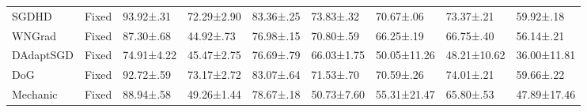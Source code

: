 \begin{tabular}{lllllllll}
    SGDHD                    & Fixed      & 93.92±.31              & 72.29±2.90          & 83.36±.25           & 73.83±.32           & 70.67±.06      & 73.37±.21             & 59.92±.18             \\
    WNGrad                   & Fixed      & 87.30±.68              & 44.92±.73           & 76.98±.15           & 70.80±.59           & 66.25±.19      & 66.75±.40             & 56.14±.21             \\
    DAdaptSGD                & Fixed      & 74.91±4.22             & 45.47±2.75          & 76.69±.79           & 66.03±1.75          & 50.05±11.26    & 48.21±10.62           & 36.00±11.81           \\
    DoG                      & Fixed      & 92.72±.59              & 73.17±2.72          & 83.07±.64           & 71.53±.70           & 70.59±.26      & 74.01±.21             & 59.66±.22             \\
    Mechanic                 & Fixed      & 88.94±.58              & 49.26±1.44          & 78.67±.18           & 50.73±7.60          & 55.31±21.47    & 65.80±.53             & 47.89±17.46           \\
    \bottomrule
\end{tabular}
